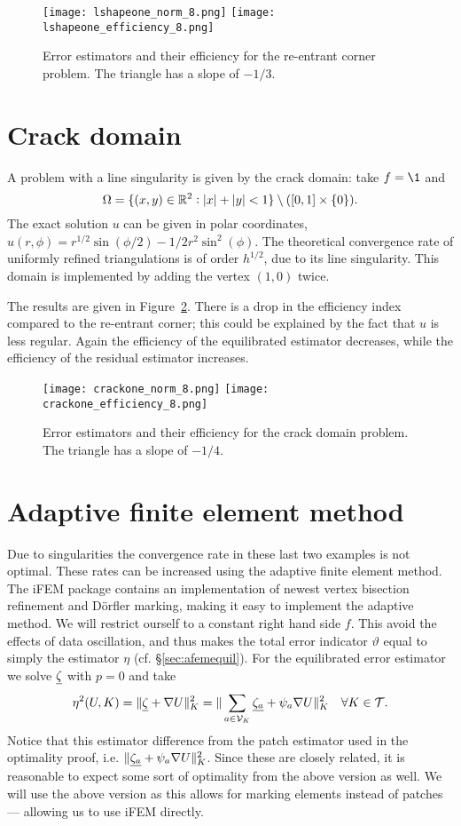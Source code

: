 \documentclass[thesis.tex]{subfiles}
\begin{document}
\begin{figure}
  \centering
  \texttt{[image: lshapeone\_norm\_8.png]}
  \texttt{[image: lshapeone\_efficiency\_8.png]}
  \caption{Error estimators and their efficiency for the re-entrant corner problem. The triangle has a slope of $-1/3$.}
  \label{fig:lshapeone}
\end{figure}

\section{Crack domain}
A problem with a line singularity is given by the crack domain: take $f = \1$ and
\[
  \Omega=\{(x,y) \in \mathbb{R}^2 : |x|+|y|<1\}\setminus ([0,1] \times \set{0}).
\]
The exact solution $u$ can be given in polar coordinates, $u(r, \phi) = r^{1/2}\sin(\phi/2) - 1/2 r^2 \sin^2 (\phi)$.
The theoretical convergence rate of uniformly refined triangulations is of order $h^{1/2}$, due to its line singularity. This
domain is implemented by adding the vertex $(1,0)$ twice.  

The results are given in Figure~\ref{fig:crackone}.
There is a drop in the efficiency index compared to the re-entrant corner; this could
be explained by the fact that $u$ is less regular. Again the efficiency of the equilibrated estimator decreases, while the efficiency
of the residual estimator increases.
\begin{figure}
  \centering
  \texttt{[image: crackone\_norm\_8.png]}
  \texttt{[image: crackone\_efficiency\_8.png]}
  \caption{Error estimators and their efficiency for the crack domain problem. The triangle has a slope of $-1/4$.}
  \label{fig:crackone}
\end{figure}

\section{Adaptive finite element method}
Due to singularities the convergence rate in these last two examples is not optimal. 
These rates can be increased using the adaptive finite element method. The iFEM package contains
an implementation of newest vertex bisection refinement and D\"orfler marking, making it easy
to implement the adaptive method. We will restrict ourself to a constant right hand side $f$. This
avoid the effects of data oscillation, and thus makes the total error indicator $\vartheta$ equal to 
simply the estimator $\eta$ (cf. \S\ref{sec:afemequil}). For the equilibrated error estimator we 
solve $\underline{\zeta}$ with $p=0$ and take
\[
  \eta^2(U, K) = \|  \underline{\zeta} + \nabla U \|^2_{K} = \| \sum_{a \in \mathcal{V}_K} \underline{\zeta_a} + \psi_a \nabla U \|^2_{K} \quad \forall K \in \mathcal{T}.
\]
Notice that this estimator difference from the patch estimator used in the optimality proof, i.e. $\| \underline{\zeta_a} + \psi_a \nabla U \|^2_K$.
Since these are closely related, it is reasonable to expect some sort of optimality from the above version as well. We will use
the above version as this allows for marking elements instead of patches --- allowing us to use iFEM directly. 
\end{document}
